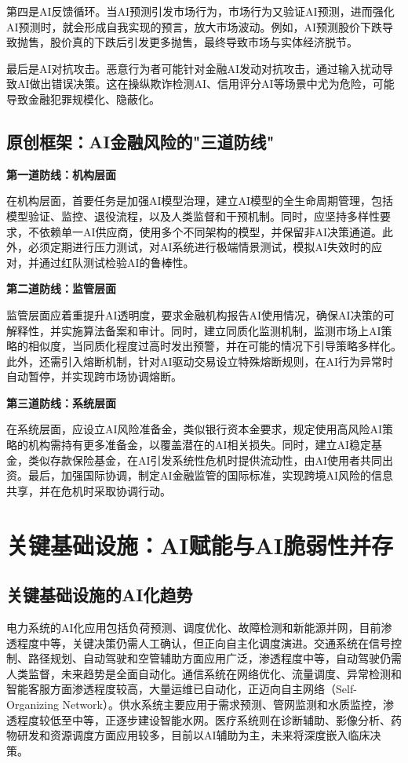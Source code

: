 第四是AI反馈循环。当AI预测引发市场行为，市场行为又验证AI预测，进而强化AI预测时，就会形成自我实现的预言，放大市场波动。例如，AI预测股价下跌导致抛售，股价真的下跌后引发更多抛售，最终导致市场与实体经济脱节。

最后是AI对抗攻击。恶意行为者可能针对金融AI发动对抗攻击，通过输入扰动导致AI做出错误决策。这在操纵欺诈检测AI、信用评分AI等场景中尤为危险，可能导致金融犯罪规模化、隐蔽化。

\subsection{原创框架：AI金融风险的"三道防线"}

\textbf{第一道防线：机构层面}

在机构层面，首要任务是加强AI模型治理，建立AI模型的全生命周期管理，包括模型验证、监控、退役流程，以及人类监督和干预机制。同时，应坚持多样性要求，不依赖单一AI供应商，使用多个不同架构的模型，并保留非AI决策通道。此外，必须定期进行压力测试，对AI系统进行极端情景测试，模拟AI失效时的应对，并通过红队测试检验AI的鲁棒性。

\textbf{第二道防线：监管层面}

监管层面应着重提升AI透明度，要求金融机构报告AI使用情况，确保AI决策的可解释性，并实施算法备案和审计。同时，建立同质化监测机制，监测市场上AI策略的相似度，当同质化程度过高时发出预警，并在可能的情况下引导策略多样化。此外，还需引入熔断机制，针对AI驱动交易设立特殊熔断规则，在AI行为异常时自动暂停，并实现跨市场协调熔断。

\textbf{第三道防线：系统层面}

在系统层面，应设立AI风险准备金，类似银行资本金要求，规定使用高风险AI策略的机构需持有更多准备金，以覆盖潜在的AI相关损失。同时，建立AI稳定基金，类似存款保险基金，在AI引发系统性危机时提供流动性，由AI使用者共同出资。最后，加强国际协调，制定AI金融监管的国际标准，实现跨境AI风险的信息共享，并在危机时采取协调行动。

\section{关键基础设施：AI赋能与AI脆弱性并存}

\subsection{关键基础设施的AI化趋势}

电力系统的AI化应用包括负荷预测、调度优化、故障检测和新能源并网，目前渗透程度中等，关键决策仍需人工确认，但正向自主化调度演进。交通系统在信号控制、路径规划、自动驾驶和空管辅助方面应用广泛，渗透程度中等，自动驾驶仍需人类监督，未来趋势是全面自动化。通信系统在网络优化、流量调度、异常检测和智能客服方面渗透程度较高，大量运维已自动化，正迈向自主网络（Self-Organizing Network）。供水系统主要应用于需求预测、管网监测和水质监控，渗透程度较低至中等，正逐步建设智能水网。医疗系统则在诊断辅助、影像分析、药物研发和资源调度方面应用较多，目前以AI辅助为主，未来将深度嵌入临床决策。

